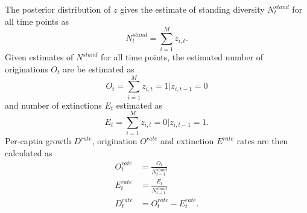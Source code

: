 \documentclass[12pt,letterpaper]{article}
\begin{document}
The posterior distribution of \(z\) gives the estimate of standing diversity \(N^{stand}_{t}\) for all time points as 
\begin{equation}
  N^{stand}_{t} = \sum_{i = 1}^{M} z_{i, t}.
  \label{eq:stand_est}
\end{equation}
Given estimates of \(N^{stand}\) for all time points, the estimated number of originations \(O_{t}\) are be estimated as 
\begin{equation}
  O_t = \sum_{i = 1}^{M} z_{i, t} = 1 | z_{i, t - 1} = 0
  \label{eq:orig_est}
\end{equation}
and number of extinctions \(E_{t}\) estimated as
\begin{equation}
  E_{t} = \sum_{i = 1}^{M} z_{i, t} = 0 | z_{i, t - 1} = 1.
  \label{eq:death_est}
\end{equation}
Per-captia growth \(D^{rate}\), origination \(O^{rate}\) and extinction \(E^{rate}\) rates are then calculated as
\begin{equation}
  \begin{aligned}
    O^{rate}_{t} &= \frac{O_t}{N^{stand}_{t - 1}} \\
    E^{rate}_{t} &= \frac{E_t}{N^{stand}_{t - 1}} \\
    D^{rate}_{t} &= O^{rate}_{t} - E^{rate}_{t}. \\
  \end{aligned}
  \label{eq:per_capita_est}
\end{equation}

\end{document}
